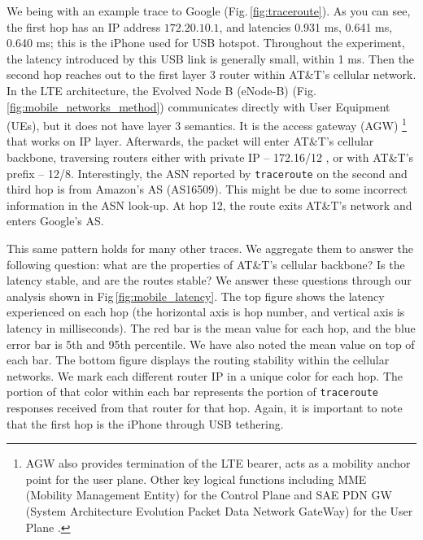 We being with an example trace to Google (Fig.\,\ref{fig:traceroute}). As you can see, the first hop has an IP address $172.20.10.1$, and latencies 0.931 ms, 0.641 ms, 0.640 ms; this is the iPhone used for USB hotspot. Throughout the experiment, the latency introduced by this USB link is generally small, within 1 ms. Then the second hop reaches out to the first layer 3 router within AT\&T's cellular network. In the LTE architecture, the Evolved Node B (eNode-B) (Fig.\,\ref{fig:mobile_networks_method}) communicates directly with User Equipment (UEs), but it does not have layer 3 semantics. It is the access gateway (AGW) \footnote{AGW also provides termination of the LTE bearer, acts as a mobility anchor point for the user plane. Other key logical functions including MME (Mobility Management Entity) for the Control Plane and SAE PDN GW (System Architecture Evolution Packet Data Network GateWay) for the User Plane \cite{nortel}.} that works on IP layer. Afterwards, the packet will enter AT\&T's cellular backbone, traversing routers either with private IP -- 172.16/12 \cite{rekhterrfc}, or with AT\&T's prefix -- 12/8. Interestingly, the ASN reported by \texttt{traceroute} on the second and third hop is from Amazon's AS (AS16509). This might be due to some incorrect information in the ASN look-up. At hop 12, the route exits AT\&T's network and enters Google's AS.

This same pattern holds for many other traces. We aggregate them to answer the following question: what are the properties of AT\&T's cellular backbone? Is the latency stable, and are the routes stable? We answer these questions through our analysis shown in Fig\,\ref{fig:mobile_latency}. The top figure shows the latency experienced on each hop (the horizontal axis is hop number, and vertical axis is latency in milliseconds). The red bar is the mean value for each hop, and the blue error bar is 5th and 95th percentile. We have also noted the mean value on top of each bar. The bottom figure displays the routing stability within the cellular networks. We mark each different router IP in a unique color for each hop. The portion of that color within each bar represents the portion of \texttt{traceroute} responses received from that router for that hop. Again, it is important to note that the first hop is the iPhone through USB tethering.

